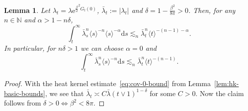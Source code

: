 \documentclass[11pt, a4paper]{scrartcl}
\numberwithin{equation}{section}
\theoremstyle{plain}
\newtheorem{lemma}[foo]{Lemma}
\theoremstyle{remark}
\newcommand{\mathd}{\mathrm{d}}
\newcommand{\mathe}{\mathrm{e}}
\begin{document}
\begin{lemma}
  \label{lem:lambda-integrability}Let $\lambda_t = \lambda
  \mathe^{\frac{\beta}{2}^2 G_t (0)}$, $\bar{\lambda}_t:=|\lambda_t|$ and $\delta = 1 - \frac{\beta^2}{8 \pi} >
  0$. Then, for any $n \in \mathbb{N}$ and $\alpha > 1 - n \delta$,
  \begin{equation}
    \int_t^{\infty} \bar{\lambda}_s^n \langle s \rangle^{- n} \langle s \rangle^{-
    \alpha} \mathd s \lesssim_n \bar{\lambda}_t^n \langle t \rangle^{- (n - 1) -
    \alpha} . \label{eq:int-alpha}
  \end{equation}
  In particular, for $n \delta > 1$ we can choose $\alpha = 0$ and
  \begin{equation}
    \int_t^{\infty} \bar{\lambda}_s^n \langle s \rangle^{- n} \mathd s \lesssim_n
    \bar{\lambda}_t^n \langle t \rangle^{- (n - 1)} . \label{eq:int-rem}
  \end{equation}
\end{lemma}

\begin{proof}
  With the heat kernel estimate~\eqref{eq:cov-0-bound} from
  Lemma~\ref{lem:hk-basic-bounds}, we see that $\bar{\lambda}_t \asymp  C \bar{\lambda} (t \vee
  1)^{1 - \delta}$ for some $C > 0$. Now the claim follows from $\delta > 0
  \Leftrightarrow \beta^2 < 8 \pi$.
\end{proof}
\end{document}
